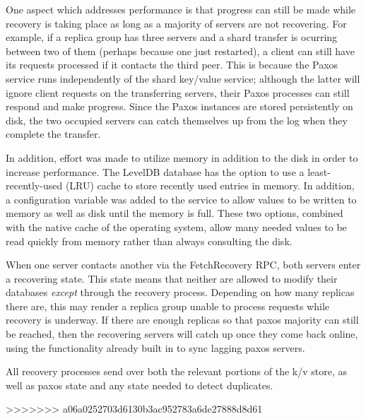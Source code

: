 \documentclass[letterpaper,10pt]{article}
\begin{document}
\begin{itemize}
One aspect which addresses performance is that progress can still
be made while recovery is taking place as long as a majority of
servers are not recovering.  For example, if a replica group has
three servers and a shard transfer is ocurring between two of them
(perhaps because one just restarted), a client can still have its
requests processed if it contacts the third peer.  This is because
the Paxos service runs independently of the shard key/value
service; although the latter will ignore client requests on the
transferring servers, their Paxos processes can still respond and
make progress.  Since the Paxos instances are stored persistently
on disk, the two occupied servers can catch themselves up from the
log when they complete the transfer.

In addition, effort was made to utilize memory in addition to the
disk in order to increase performance.  The LevelDB database has
the option to use a least-recently-used (LRU) cache to store
recently used entries in memory.  In addition, a configuration
variable was added to the service to allow values to be written to
memory as well as disk until the memory is full.  These two
options, combined with the native cache of the operating system,
allow many needed values to be read quickly from memory rather than
always consulting the disk.

When one server contacts another via the FetchRecovery RPC, both
servers enter a recovering state. This state means that neither are
allowed to modify their databases \emph{except} through the
recovery process. Depending on how many replicas there are, this
may render a replica group unable to process requests while
recovery is underway.  If there are enough replicas so that paxos
majority can still be reached, then the recovering servers will
catch up once they come back online, using the functionality
already built in to sync lagging paxos servers.

All recovery processes send over both the relevant portions of the
k/v store, as well as paxos state and any state needed to detect
duplicates.


>>>>>>> a06a0252703d6130b3ac952783a6de27888d8d61


\end{itemize}
\end{document}
